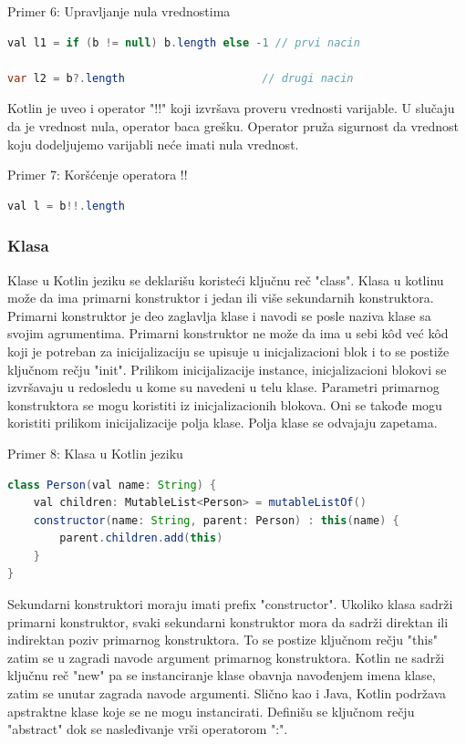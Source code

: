 \documentclass[12pt,oneside]{memoir}
\begin{document}
\begin{center} Primer 6: Upravljanje nula vrednostima\end{center}
\begin{lstlisting}[language=Java]
val l1 = if (b != null) b.length else -1 // prvi nacin
 
var l2 = b?.length                     // drugi nacin
\end{lstlisting}
 
Kotlin je uveo i operator "!!" koji izvršava proveru vrednosti varijable. U slučaju da je vrednost nula, operator baca grešku. Operator pruža sigurnost da vrednost koju dodeljujemo varijabli neće imati nula vrednost.
 
\begin{center} Primer 7: Koršćenje operatora !!\end{center}
\begin{lstlisting}[language=Java]
val l = b!!.length
\end{lstlisting}
 
\subsubsection{Klasa}
Klase u Kotlin jeziku se deklarišu koristeći ključnu reč "class". Klasa u kotlinu može da ima primarni konstruktor i jedan ili više sekundarnih konstruktora. Primarni konstruktor je deo zaglavlja klase i navodi se posle naziva klase sa svojim agrumentima. Primarni konstruktor ne može da ima u sebi kôd već kôd koji je potreban za inicijalizaciju se upisuje u inicjalizacioni blok i to se postiže ključnom rečju "init". Prilikom inicijalizacije instance, inicjalizacioni blokovi se izvršavaju u redosledu u kome su navedeni u telu klase. Parametri primarnog konstruktora se mogu koristiti iz inicjalizacionih blokova. Oni se takođe mogu koristiti prilikom inicijalizacije polja klase. Polja klase se odvajaju zapetama. 
 
\begin{center} Primer 8: Klasa u Kotlin jeziku\end{center}
\begin{lstlisting}[language=Java]
class Person(val name: String) {
    val children: MutableList<Person> = mutableListOf()
    constructor(name: String, parent: Person) : this(name) {
        parent.children.add(this)
    }
}
\end{lstlisting}
 
Sekundarni konstruktori moraju imati prefix "constructor". Ukoliko klasa sadrži primarni konstruktor, svaki sekundarni konstruktor mora da sadrži direktan ili indirektan poziv primarnog konstruktora. To se postize ključnom rečju "this" zatim se u zagradi navode argument primarnog konstruktora. Kotlin ne sadrži ključnu reč "new" pa se instanciranje klase obavnja navođenjem imena klase, zatim se unutar zagrada navode argumenti. Slično kao i Java, Kotlin podržava apstraktne klase koje se ne mogu instancirati. Definišu se ključnom rečju "abstract" dok se nasleđivanje vrši operatorom ":".
 
\end{document}
